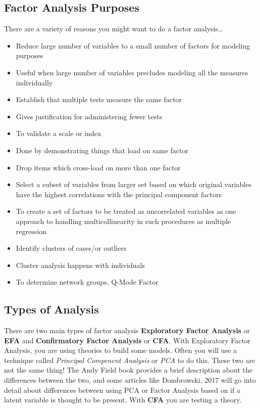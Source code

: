 \documentclass[]{book}
\providecommand{\tightlist}{%
  \setlength{\itemsep}{0pt}\setlength{\parskip}{0pt}}
\theoremstyle{definition}
\theoremstyle{definition}
\theoremstyle{definition}
\theoremstyle{remark}
\begin{document}
\subsection{Factor Analysis Purposes}\label{factor-analysis-purposes}

There are a variety of reasons you might want to do a factor
analysis\ldots{}

\begin{itemize}
\tightlist
\item
  Reduce large number of variables to a small number of factors for
  modeling purposes
\item
  Useful when large number of variables precludes modeling all the
  measures individually
\item
  Establish that multiple tests measure the same factor
\item
  Gives justification for administering fewer tests
\item
  To validate a scale or index
\item
  Done by demonstrating things that load on same factor
\item
  Drop items which cross-load on more than one factor
\item
  Select a subset of variables from larger set based on which original
  variables have the highest correlations with the principal component
  factors
\item
  To create a set of factors to be treated as uncorrelated variables as
  one approach to handling multicollinearity in such procedures as
  multiple regression
\item
  Identify clusters of cases/or outliers
\item
  Cluster analysis happens with individuals
\item
  To determine network groups, Q-Mode Factor
\end{itemize}

\subsection{Types of Analysis}\label{types-of-analysis}

There are two main types of factor analysis \textbf{Exploratory Factor
Analysis} or \textbf{EFA} and \textbf{Confirmatory Factor Analysis} or
\textbf{CFA}. With Exploratory Factor Analysis, you are using theories
to build some models. Often you will use a technique called
\emph{Principal Compenent Analysis} or \emph{PCA} to do this. These two
are not the same thing! The Andy Field book provides a brief description
about the differences between the two, and some articles like
Dombrowski, 2017 will go into detail about differences between using PCA
or Factor Analysis based on if a latent variable is thought to be
present. With \textbf{CFA} you are testing a theory.
\end{document}
